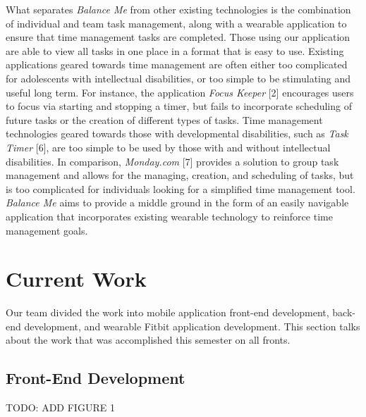 \documentclass{sigchi}
\begin{document}
What separates \textit{Balance Me} from other existing technologies is the
combination of individual and team task management, along with a wearable
application to ensure that time management tasks are completed. Those using our
application are able to view all tasks in one place in a format that is easy to
use. Existing applications geared towards time management are often either too
complicated for adolescents with intellectual disabilities, or too simple to be
stimulating and useful long term. For instance, the application
\textit{Focus Keeper} [2] encourages users to focus via starting and stopping a
timer, but fails to incorporate scheduling of future tasks or the creation of
different types of tasks. Time management technologies geared towards those with
developmental disabilities, such as \textit{Task Timer} [6], are too simple to
be used by those with and without intellectual disabilities. In comparison,
\textit{Monday.com} [7] provides a solution to group task management and allows
for the managing, creation, and scheduling of tasks, but is too complicated for
individuals looking for a simplified time management tool. \textit{Balance Me}
aims to provide a middle ground in the form of an easily navigable application
that incorporates existing wearable technology to reinforce time management
goals.


\section{Current Work}

Our team divided the work into mobile application front-end development,
back-end development, and wearable Fitbit application development. This section
talks about the work that was accomplished this semester on all fronts.


\subsection{Front-End Development}

TODO: ADD FIGURE 1

\end{document}
